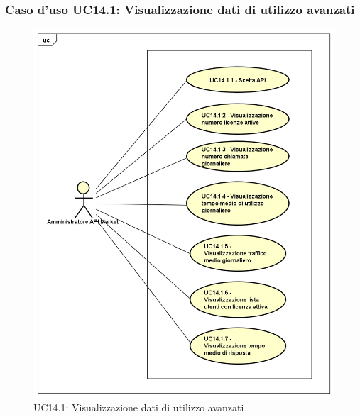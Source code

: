 \subsubsection{Caso d'uso UC14.1: Visualizzazione dati di utilizzo avanzati}
\label{UC14_1}
\begin{figure}[ht]
	\centering
	\includegraphics[scale=0.45]{UML/UC14_1.png}
	\caption{UC14.1: Visualizzazione dati di utilizzo avanzati}
\end{figure}

